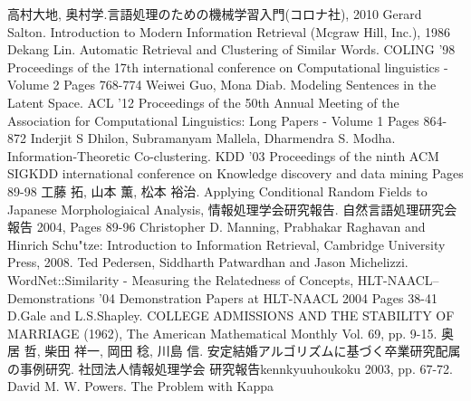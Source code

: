 \documentclass[12pt]{jarticle}
\begin{document}
\newpage
\pagestyle{empty}
\begin{thebibliography}{9}
   高村大地, 奥村学.言語処理のための機械学習入門(コロナ社), 2010
   Gerard Salton. Introduction to Modern Information Retrieval (Mcgraw Hill, Inc.), 1986
   Dekang Lin. Automatic Retrieval and Clustering of Similar Words. COLING '98 Proceedings of the 17th international conference on Computational linguistics - Volume 2 Pages 768-774
   Weiwei Guo, Mona Diab. Modeling Sentences in the Latent Space. ACL '12 Proceedings of the 50th Annual Meeting of the Association for Computational Linguistics: Long Papers - Volume 1
Pages 864-872
   Inderjit S Dhilon, Subramanyam Mallela, Dharmendra S. Modha. Information-Theoretic Co-clustering. KDD '03 Proceedings of the ninth ACM SIGKDD international conference on Knowledge discovery and data mining
Pages 89-98
  工藤 拓, 山本 薫, 松本 裕治. Applying Conditional Random Fields to Japanese Morphologiaical Analysis, 情報処理学会研究報告. 自然言語処理研究会報告 2004, Pages 89-96
  Christopher D. Manning, Prabhakar Raghavan and Hinrich Schu"tze: Introduction to Information Retrieval, Cambridge University Press, 2008.
 Ted Pedersen, Siddharth Patwardhan and Jason Michelizzi. WordNet::Similarity - Measuring the Relatedness of Concepts, HLT-NAACL--Demonstrations '04 Demonstration Papers at HLT-NAACL 2004 Pages 38-41
  D.Gale and L.S.Shapley. COLLEGE ADMISSIONS AND THE STABILITY OF MARRIAGE (1962), The American Mathematical Monthly Vol. 69, pp. 9-15.
  奥居 哲, 柴田 祥一, 岡田 稔, 川島 信. 安定結婚アルゴリズムに基づく卒業研究配属の事例研究. 社団法人情報処理学会 研究報告kennkyuuhoukoku 2003, pp. 67-72.
  David M. W. Powers. The Problem with Kappa
\end{thebibliography}
\end{document}
